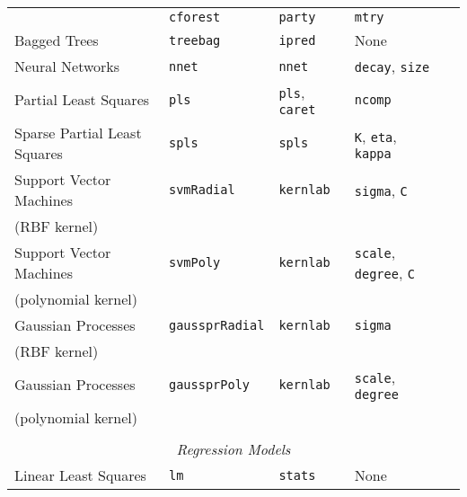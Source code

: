 \documentclass[12pt]{article}
\begin{document}
\begin{longtable}{lllll}
       & 
         \texttt{cforest} & 
            \texttt{party}       & 
            \texttt{mtry} \\     
                        
      Bagged Trees &
         \texttt{treebag} & 
            \texttt{ipred}       & 
            None \\                         
                        
      Neural Networks &               
         \texttt{nnet} & 
            \texttt{nnet}       &       
            \texttt{decay}, \texttt{size} \\      
      
      Partial Least Squares &
         \texttt{pls} & 
            \texttt{pls}, \texttt{caret}       & 
            \texttt{ncomp} \\      

      Sparse Partial Least Squares &
         \texttt{spls} & 
            \texttt{spls}      & 
            \texttt{K}, \texttt{eta}, \texttt{kappa} \\   
            
      Support Vector Machines  &
         \texttt{svmRadial} & 
            \texttt{kernlab}       & 
            \texttt{sigma}, \texttt{C} \\            
      \:\: (RBF kernel) & & &\\   
      
      Support Vector Machines  &
         \texttt{svmPoly} & 
            \texttt{kernlab}       & 
            \texttt{scale}, \texttt{degree}, \texttt{C} \\            
      \:\: (polynomial kernel) & & &\\  
     Gaussian Processes  &
         \texttt{gaussprRadial} & 
            \texttt{kernlab}       & 
            \texttt{sigma} \\            
      \:\: (RBF kernel) & & &\\   
      
      Gaussian Processes  &
         \texttt{gaussprPoly} & 
            \texttt{kernlab}       & 
            \texttt{scale}, \texttt{degree} \\            
      \:\: (polynomial kernel) & & &\\  
    
      \\
\multicolumn{5}{c}{{{ \em Regression Models}}} \\      
    
      Linear Least Squares &
         \texttt{lm} & 
            \texttt{stats}       & 
            None \\  
      

\end{longtable}
\end{document}
